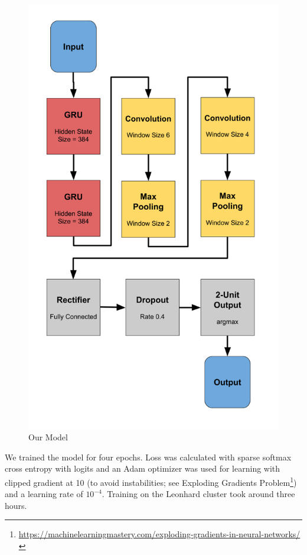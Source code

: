 \documentclass[10pt,conference,compsocconf]{IEEEtran}
\begin{document}
\begin{figure}[h!]
  \centering
  \includegraphics[scale=0.35]{our_model_architecture.png}
  \caption{Our Model}
  \label{fig:ourmodel}
\end{figure}

We trained the model for four epochs. Loss was calculated with sparse softmax cross
entropy with logits and an Adam optimizer was used for learning with clipped
gradient at 10 (to avoid instabilities; see Exploding Gradients
Problem\footnote{\url{https://machinelearningmastery.com/exploding-gradients-in-neural-networks/}})
and a learning rate of $10^{-4}$. Training on the Leonhard cluster took around
three hours.
\end{document}
